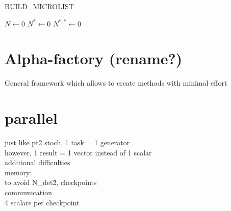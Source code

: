 \begin{algorithm}
	\label{BUILD_MICROLIST}
	\caption{BUILD\_MICROLIST}
		\KwData{ ------}
		\KwResult{ ------}
        $N \gets 0$ \;
        $N^* \gets 0$ \;   
        $N^{*,*} \gets 0$ \;    
\end{algorithm}


\section{Alpha-factory (rename?)}


General framework which allows to create methods with minimal effort 

\section{parallel}
just like pt2 stoch, 1 task = 1 generator \\
however, 1 result = 1 vector instead of 1 scalar \\
additional difficulties \\
memory: \\
to avoid N\_det\^2, checkpoints \\
communication \\
4 scalars per checkpoint \\



      